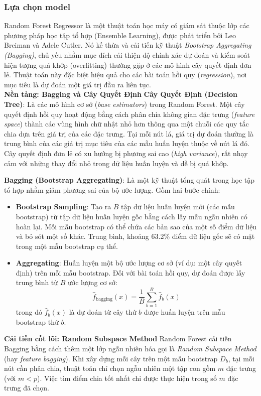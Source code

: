 \documentclass[12pt]{report}
\begin{document}
{\subsubsection{Lựa chọn model}
Random Forest Regressor là một thuật toán học máy có giám sát thuộc lớp các phương pháp học tập tổ hợp (Ensemble Learning), được phát triển bởi Leo Breiman và Adele Cutler. Nó kế thừa và cải tiến kỹ thuật \textit{Bootstrap Aggregating (Bagging)}, chủ yếu nhằm mục đích cải thiện độ chính xác dự đoán và kiểm soát hiện tượng quá khớp (overfitting) thường gặp ở các mô hình cây quyết định đơn lẻ. Thuật toán này đặc biệt hiệu quả cho các bài toán hồi quy (\textit{regression}), nơi mục tiêu là dự đoán một giá trị đầu ra liên tục.\\
\textbf{Nền tảng: Bagging và Cây Quyết Định}
\textbf{Cây Quyết Định (Decision Tree)}: Là các mô hình cơ sở (\textit{base estimators}) trong Random Forest. Một cây quyết định hồi quy hoạt động bằng cách phân chia không gian đặc trưng (\textit{feature space}) thành các vùng hình chữ nhật nhỏ hơn thông qua một chuỗi các quy tắc chia dựa trên giá trị của các đặc trưng. Tại mỗi nút lá, giá trị dự đoán thường là trung bình của các giá trị mục tiêu của các mẫu huấn luyện thuộc về nút lá đó. Cây quyết định đơn lẻ có xu hướng bị phương sai cao (\textit{high variance}), rất nhạy cảm với những thay đổi nhỏ trong dữ liệu huấn luyện và dễ bị quá khớp.

\textbf*{Bagging (Bootstrap Aggregating)}: Là một kỹ thuật tổng quát trong học tập tổ hợp nhằm giảm phương sai của bộ ước lượng. Gồm hai bước chính:

\begin{itemize}
    \item \textbf{Bootstrap Sampling}: Tạo ra $B$ tập dữ liệu huấn luyện mới (các mẫu bootstrap) từ tập dữ liệu huấn luyện gốc bằng cách lấy mẫu ngẫu nhiên có hoàn lại. Mỗi mẫu bootstrap có thể chứa các bản sao của một số điểm dữ liệu và bỏ sót một số khác. Trung bình, khoảng 63.2\% điểm dữ liệu gốc sẽ có mặt trong một mẫu bootstrap cụ thể.
    \item \textbf{Aggregating}: Huấn luyện một bộ ước lượng cơ sở (ví dụ: một cây quyết định) trên mỗi mẫu bootstrap. Đối với bài toán hồi quy, dự đoán được lấy trung bình từ $B$ ước lượng cơ sở:
    \[
    \hat{f}_{\text{bagging}}(x) = \frac{1}{B} \sum_{b=1}^{B} \hat{f}_b(x)
    \]
    trong đó $\hat{f}_b(x)$ là dự đoán từ cây thứ $b$ được huấn luyện trên mẫu bootstrap thứ $b$.
\end{itemize}

\textbf*{Cải tiến cốt lõi: Random Subspace Method}
Random Forest cải tiến Bagging bằng cách thêm một lớp ngẫu nhiên hóa gọi là \textit{Random Subspace Method} (hay \textit{feature bagging}). Khi xây dựng mỗi cây trên một mẫu bootstrap $D_b$, tại mỗi nút cần phân chia, thuật toán chỉ chọn ngẫu nhiên một tập con gồm $m$ đặc trưng (với $m < p$). Việc tìm điểm chia tốt nhất chỉ được thực hiện trong số $m$ đặc trưng đã chọn.

}
\end{document}
